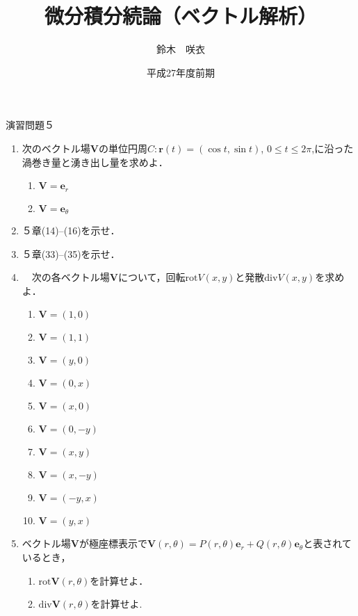 \documentclass{jarticle}
\begin{document}
\title{微分積分続論（ベクトル解析）} 
\author{鈴木　咲衣}
\date{平成27年度前期}
\maketitle

\begin{center} {\Large 演習問題５ } \end{center}

\begin{enumerate}
\item 次のベクトル場$\bm V$の単位円周$C: \bm r(t)=(\cos t, \sin t)$, $0\leq t\leq 2\pi$,に沿った渦巻き量と湧き出し量を求めよ．
\begin{enumerate}
\item
$\bm V=\bm e_{r}$
\item
$\bm V=\bm e_{\theta}$
\end{enumerate}
\item ５章(14)--(16)を示せ．
\item ５章(33)--(35)を示せ．
\item \cite[問題6.16]{koba}　次の各ベクトル場$\bm V$について，回転$\mathrm {rot} V(x,y)$と発散$\mathrm {div} V(x,y)$を求めよ．
\begin{enumerate}
\item $\bm V=(1,0)$
\item $\bm V=(1,1)$
\item $\bm V=(y,0)$
\item $\bm V=(0,x)$
\item $\bm V=(x,0)$
\item $\bm V=(0,-y)$
\item $\bm V=(x,y)$
\item $\bm V=(x,-y)$
\item $\bm V=(-y,x)$
\item $\bm V=(y,x)$
\end{enumerate}
\item \cite[問題6.24, 6.28]{koba}ベクトル場$\bm V$が極座標表示で$\bm V(r, \theta)=P(r,\theta) \bm e_{r}+ Q (r, \theta) \bm e_{\theta}$と表されているとき，
\begin{enumerate}
\item $\mathrm {rot} \bm V (r,\theta)$を計算せよ．
\item $\mathrm {div} \bm V (r,\theta)$を計算せよ. 
\end{enumerate}
\end{enumerate}

\newpage
\end{document}

